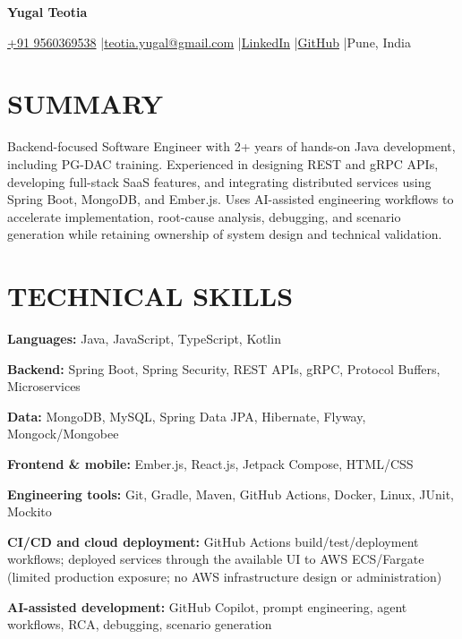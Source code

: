 \documentclass[a4paper,10pt]{article}
\begin{document}
{\centering
{\fontsize{19}{22}\selectfont\bfseries Yugal Teotia}\par
\vspace{5pt}
{\small \href{tel:+919560369538}{+91 9560369538} \enspace|\enspace \href{mailto:teotia.yugal@gmail.com}{teotia.yugal@gmail.com} \enspace|\enspace \href{https://www.linkedin.com/in/yugalteotia/}{LinkedIn} \enspace|\enspace \href{https://github.com/yugalteotia}{GitHub} \enspace|\enspace Pune, India}\par
}

\section{SUMMARY}
Backend-focused Software Engineer with 2+ years of hands-on Java development, including PG-DAC training. Experienced in designing REST and gRPC APIs, developing full-stack SaaS features, and integrating distributed services using Spring Boot, MongoDB, and Ember.js. Uses AI-assisted engineering workflows to accelerate implementation, root-cause analysis, debugging, and scenario generation while retaining ownership of system design and technical validation.

\section{TECHNICAL SKILLS}
\textbf{Languages:} Java, JavaScript, TypeScript, Kotlin\par\vspace{1pt}
\textbf{Backend:} Spring Boot, Spring Security, REST APIs, gRPC, Protocol Buffers, Microservices\par\vspace{1pt}
\textbf{Data:} MongoDB, MySQL, Spring Data JPA, Hibernate, Flyway, Mongock/Mongobee\par\vspace{1pt}
\textbf{Frontend \& mobile:} Ember.js, React.js, Jetpack Compose, HTML/CSS\par\vspace{1pt}
\textbf{Engineering tools:} Git, Gradle, Maven, GitHub Actions, Docker, Linux, JUnit, Mockito\par\vspace{1pt}
\textbf{CI/CD and cloud deployment:} GitHub Actions build/test/deployment workflows; deployed services through the available UI to AWS ECS/Fargate (limited production exposure; no AWS infrastructure design or administration)\par\vspace{1pt}
\textbf{AI-assisted development:} GitHub Copilot, prompt engineering, agent workflows, RCA, debugging, scenario generation
\end{document}
